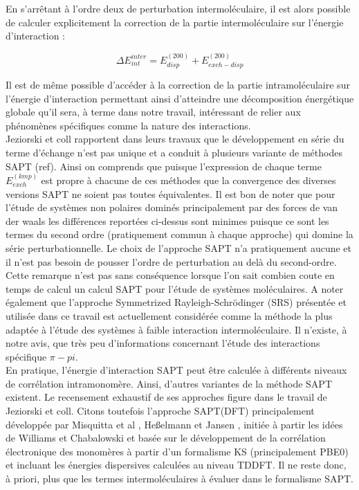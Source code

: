 En s’arrêtant à l’ordre deux de perturbation intermoléculaire, il est alors possible de calculer explicitement la correction de la partie intermoléculaire sur l’énergie d’interaction :
   				
\begin{equation}
\Delta E_{int}^{inter} =  E_{disp}^{(200)} + E_{exch-disp}^{(200)}
\end{equation}

Il est de même possible d’accéder à la correction de la partie intramoléculaire sur l’énergie d’interaction permettant ainsi d’atteindre une décomposition énergétique globale qu’il sera, à terme dans notre travail, intéressant de relier aux phénomènes spécifiques comme la nature des interactions.\\
   				
Jeziorski et coll rapportent dans leurs travaux que le développement en série du terme d’échange n’est pas unique et a conduit à plusieurs variante de méthodes SAPT (ref). Ainsi on comprends que puisque l’expression de chaque terme $E_{exch}^{(kmp)}$ est propre à chacune de ces méthodes que la convergence des diverses versions SAPT ne soient pas toutes équivalentes. Il est bon de noter que pour l’étude de systèmes non polaires dominés principalement par des forces de van der waals les différences reportées ci-dessus sont minimes puisque ce sont les termes du second ordre (pratiquement commun à chaque approche) qui domine la série perturbationnelle. Le choix de l’approche SAPT n’a pratiquement aucune et il n’est pas besoin de pousser l’ordre de perturbation au delà du second-ordre. Cette remarque n’est pas sans conséquence lorsque l’on sait combien coute en temps de calcul un calcul SAPT pour l’étude de systèmes moléculaires. A noter également que l’approche Symmetrized Rayleigh-Schr\"{o}dinger (SRS) présentée et utilisée dans ce travail est actuellement considérée comme la méthode la plus adaptée à l’étude des systèmes à faible interaction intermoléculaire. Il n’existe, à notre avis, que très peu d’informations concernant l’étude des interactions spécifique $\pi-pi$.\\
   					
   					
En pratique, l’énergie d'interaction SAPT peut être calculée à différents niveaux de corrélation intramonomère. Ainsi, d’autres variantes de la méthode SAPT existent.
Le recensement exhaustif de ses approches figure dans le travail de Jeziorski et coll. Citons toutefois l’approche SAPT(DFT) principalement développée par 
Misquitta et al \cite{misquitta2005intermolecular}, Heßelmann et Jansen \cite{hesselmann2002first}, initiée à partir les idées de Williams et Chabalowski \cite{williams2001using} et basée sur le développement de la corrélation électronique des monomères à partir d’un formalisme KS (principalement PBE0) et incluant les énergies dispersives calculées au niveau TDDFT. Il ne reste donc, à priori, plus que les termes intermoléculaires à évaluer dans le formalisme SAPT.\\
   					

